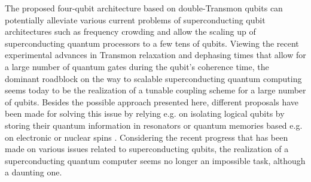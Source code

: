 The proposed four-qubit architecture based on double-Transmon qubits can potentially alleviate various current problems of superconducting qubit architectures such as frequency crowding and allow the scaling up of superconducting quantum processors to a few tens of qubits. Viewing the recent experimental advances in Transmon relaxation and dephasing times \citep{paik_observation_2011} that allow for a large number of quantum gates during the qubit's coherence time, the dominant roadblock on the way to scalable superconducting quantum computing seems today to be the realization of a tunable coupling scheme for a large number of qubits. Besides the possible approach presented here, different proposals have been made for solving this issue by relying e.g. on isolating logical qubits by storing their quantum information in resonators \citep{galiautdinov_resonatorzero-qubit_2012,mariantoni_implementing_2011} or quantum memories based e.g. on electronic or nuclear spins \citep{zhu_coherent_2011,kubo_storage_2012,kubo_hybrid_2011}. Considering the recent progress that has been made on various issues related to superconducting qubits, the realization of a superconducting quantum computer seems no longer an impossible task, although a daunting one.